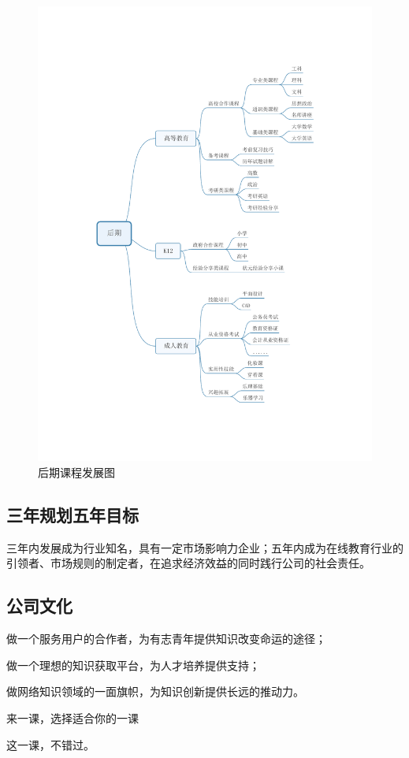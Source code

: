\begin{figure}[H]
	\centering
	\includegraphics[width=0.9\columnwidth]{figures/aft_development}%
	\caption{后期课程发展图}
	\label{fg:aft_development}
\end{figure}

\subsection{三年规划五年目标}
三年内发展成为行业知名，具有一定市场影响力企业；五年内成为在线教育行业的引领者、市场规则的制定者，在追求经济效益的同时践行公司的社会责任。

\subsection{公司文化}
做一个服务用户的合作者，为有志青年提供知识改变命运的途径；

做一个理想的知识获取平台，为人才培养提供支持；

做网络知识领域的一面旗帜，为知识创新提供长远的推动力。

来一课，选择适合你的一课

这一课，不错过。















